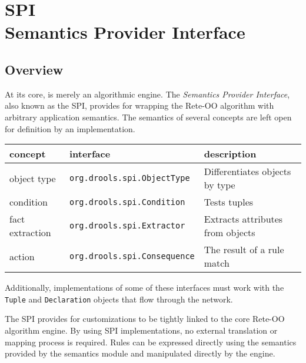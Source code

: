 \chapter[Semantics Provider Interface]{SPI\\\normalsize{Semantics Provider Interface}}

\section{Overview}

At its core, \drools{} is merely an algorithmic engine. The 
\emph{Semantics Provider Interface}, also known as the SPI,
provides for wrapping the \drools{} Rete-OO algorithm with
arbitrary application semantics. The semantics of several concepts are
left open for definition by an implementation.

\medskip

\begin{center}
  \begin{tabular}{|l|l|p{120pt}|}
    \hline
      \textsf{concept} & \textsf{interface} & \textsf{description} \\
    \hline
    \hline
      \footnotesize{object type} %
        & \texttt{\footnotesize{org.drools.spi.ObjectType}} %
        & \footnotesize{Differentiates objects by type} \\
    \hline
      \footnotesize{condition} %
        & \texttt{\footnotesize{org.drools.spi.Condition}} %
        & \footnotesize{Tests tuples}\\
    \hline
      \footnotesize{fact extraction} %
        & \texttt{\footnotesize{org.drools.spi.Extractor}} %
        & \footnotesize{Extracts attributes from objects} \\
    \hline
      \footnotesize{action} %
        & \texttt{\footnotesize{org.drools.spi.Consequence}} %
        & \footnotesize{The result of a rule match}\\
    \hline
  \end{tabular}
\end{center}

\medskip

Additionally, implementations of some of these interfaces must work
with the \verb|Tuple| and \verb|Declaration| objects that flow 
through the network.  

The SPI provides for \drools{} customizations to be tightly linked to
the core Rete-OO algorithm engine.  By using SPI implementations, no
external translation or mapping process is required.  Rules can be
expressed directly using the semantics provided by the semantics module
and manipulated directly by the engine.

